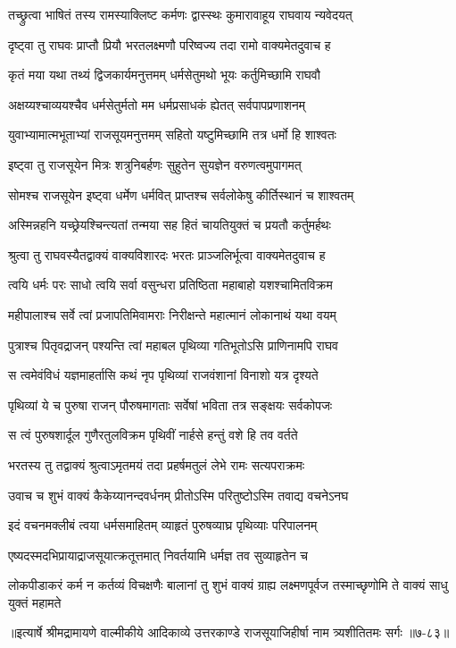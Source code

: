 
\twolineshloka
{तच्छ्रुत्वा भाषितं तस्य रामस्याक्लिष्ट कर्मणः}
{द्वास्स्थः कुमारावाहूय राघवाय न्यवेदयत्} %

\twolineshloka
{दृष्ट्वा तु राघवः प्राप्तौ प्रियौ भरतलक्ष्मणौ}
{परिष्वज्य तदा रामो वाक्यमेतदुवाच ह} %

\twolineshloka
{कृतं मया यथा तथ्यं द्विजकार्यमनुत्तमम्}
{धर्मसेतुमथो भूयः कर्तुमिच्छामि राघवौ} %

\twolineshloka
{अक्षय्यश्चाव्ययश्चैव धर्मसेतुर्मतो मम}
{धर्मप्रसाधकं ह्येतत् सर्वपापप्रणाशनम्} %

\twolineshloka
{युवाभ्यामात्मभूताभ्यां राजसूयमनुत्तमम्}
{सहितो यष्टुमिच्छामि तत्र धर्मो हि शाश्वतः} %

\twolineshloka
{इष्ट्वा तु राजसूयेन मित्रः शत्रुनिबर्हणः}
{सुहुतेन सुयज्ञेन वरुणत्वमुपागमत्} %

\twolineshloka
{सोमश्च राजसूयेन इष्ट्वा धर्मेण धर्मवित्}
{प्राप्तश्च सर्वलोकेषु कीर्तिस्थानं च शाश्वतम्} %

\twolineshloka
{अस्मिन्नहनि यच्छ्रेयश्चिन्त्यतां तन्मया सह}
{हितं चायतियुक्तं च प्रयतौ कर्तुमर्हथः} %

\twolineshloka
{श्रुत्वा तु राघवस्यैतद्वाक्यं वाक्यविशारदः}
{भरतः प्राञ्जलिर्भूत्वा वाक्यमेतदुवाच ह} %

\twolineshloka
{त्वयि धर्मः परः साधो त्वयि सर्वा वसुन्धरा}
{प्रतिष्ठिता महाबाहो यशश्चामितविक्रम} %

\twolineshloka
{महीपालाश्च सर्वे त्वां प्रजापतिमिवामराः}
{निरीक्षन्ते महात्मानं लोकानाथं यथा वयम्} %

\twolineshloka
{पुत्राश्च पितृवद्राजन् पश्यन्ति त्वां महाबल}
{पृथिव्या गतिभूतोऽसि प्राणिनामपि राघव} %

\twolineshloka
{स त्वमेवंविधं यज्ञमाहर्तासि कथं नृप}
{पृथिव्यां राजवंशानां विनाशो यत्र दृश्यते} %

\twolineshloka
{पृथिव्यां ये च पुरुषा राजन् पौरुषमागताः}
{सर्वेषां भविता तत्र सङ्क्षयः सर्वकोपजः} %

\twolineshloka
{स त्वं पुरुषशार्दूल गुणैरतुलविक्रम}
{पृथिवीं नार्हसे हन्तुं वशे हि तव वर्तते} %

\twolineshloka
{भरतस्य तु तद्वाक्यं श्रुत्वाऽमृतमयं तदा}
{प्रहर्षमतुलं लेभे रामः सत्यपराक्रमः} %

\twolineshloka
{उवाच च शुभं वाक्यं कैकेय्यानन्दवर्धनम्}
{प्रीतोऽस्मि परितुष्टोऽस्मि तवाद्य वचनेऽनघ} %

\twolineshloka
{इदं वचनमक्लीबं त्वया धर्मसमाहितम्}
{व्याहृतं पुरुषव्याघ्र पृथिव्याः परिपालनम्} %

\twolineshloka
{एष्यदस्मदभिप्रायाद्राजसूयात्क्रतूत्तमात्}
{निवर्तयामि धर्मज्ञ तव सुव्याहृतेन च} %

\threelineshloka
{लोकपीडाकरं कर्म न कर्तव्यं विचक्षणैः}
{बालानां तु शुभं वाक्यं ग्राह्य लक्ष्मणपूर्वज}
{तस्माच्छृणोमि ते वाक्यं साधु युक्तं महामते} %


॥इत्यार्षे श्रीमद्रामायणे वाल्मीकीये आदिकाव्ये उत्तरकाण्डे राजसूयाजिहीर्षा नाम त्र्यशीतितमः सर्गः ॥७-८३॥
